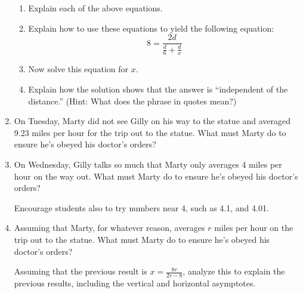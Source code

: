 \begin{prob}
\begin{enumerate}
\begin{teachingnote}

\begin{enumerate}[1.]
\item Explain each of the above equations.  
\item Explain how to use these equations to yield the following equation:  
$$8 = \frac{2d}{\frac{d}{6}+\frac{d}{x}}$$
\item Now solve this equation for $x$.  
\item Explain how the solution shows that the answer is ``independent of the distance.''  (Hint:  What does the phrase in quotes mean?)  
\end{enumerate}

\end{teachingnote}

\item On Tuesday, Marty did not see Gilly on his way to the statue and
averaged 9.23 miles per hour for the trip out to the statue.
What must Marty do to ensure he's obeyed his doctor's orders?
\item On Wednesday, Gilly talks so much
that Marty only averages 4 miles per hour on the way out.  What must
Marty do to ensure he's obeyed his doctor's orders?
\begin{teachingnote}
Encourage students also to try numbers near 4, such as 4.1, and 4.01.
\end{teachingnote}

\item Assuming that Marty, for whatever reason, averages $r$ miles per hour on
the trip out to the statue. What must Marty do to ensure he's obeyed
his doctor's orders?

\begin{teachingnote}
Assuming that the previous result is $x=\frac{8r}{2r-8}$, analyze this to explain the previous results, including the vertical and horizontal asymptotes.
\end{teachingnote}
\end{enumerate}
\end{prob}


%

